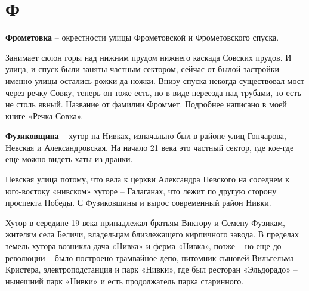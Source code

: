 \chapter*{Ф}

\textbf{Фрометовка} – окрестности улицы Фрометовской и Фрометовского спуска.

Занимает склон горы над нижним прудом нижнего каскада Совских прудов. И улица, и спуск были заняты частным сектором, сейчас от былой застройки именно улицы остались рожки да ножки. Внизу спуска некогда существовал мост через речку Совку, теперь он тоже есть, но в виде переезда над трубами, то есть не столь явный. Название от фамилии Фроммет. Подробнее написано в моей книге «Речка Совка».\\

\medskip

\textbf{Фузиковщина} – хутор на Нивках, изначально был в районе улиц Гончарова, Невская и Александровская. На начало 21 века это частный сектор, где кое-где еще можно видеть хаты из дранки.

Невская улица потому, что вела к церкви Александра Невского на соседнем к юго-востоку «нивском» хуторе – Галаганах, что лежит по другую сторону проспекта Победы. С Фузиковщины и вырос современный район Нивки.

Хутор в середине 19 века принадлежал братьям Виктору и Семену Фузикам, жителям села Беличи, владельцам близлежащего кирпичного завода. В пределах земель хутора возникла дача «Нивка» и ферма «Нивка», позже – но еще до революции – было построено трамвайное депо, питомник сыновей Вильгельма Кристера, электроподстанция и парк «Нивки», где был ресторан «Эльдорадо» – нынешний парк «Нивки» и есть продолжатель парка старинного.

